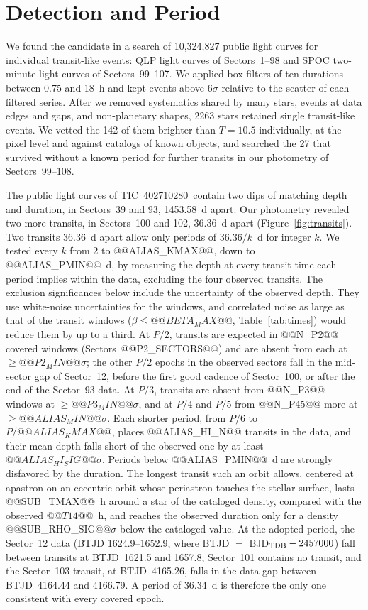 \documentclass[twocolumn,linenumbers]{aastex701}
\newcommand{\tic}{TIC~402710280}
\begin{document}
\section{Detection and Period} \label{sec:period}

We found the candidate in a search of 10,324,827 public light curves for individual transit-like events: QLP light curves of Sectors~1--98 and SPOC two-minute light curves \citep{TESSLC} of Sectors~99--107. We applied box filters of ten durations between 0.75 and 18~h and kept events above $6\sigma$ relative to the scatter of each filtered series. After we removed systematics shared by many stars, events at data edges and gaps, and non-planetary shapes, 2263 stars retained single transit-like events. We vetted the 142 of them brighter than $T = 10.5$ individually, at the pixel level and against catalogs of known objects, and searched the 27 that survived without a known period for further transits in our photometry of Sectors~99--108.

The public light curves of \tic\ contain two dips of matching depth and duration, in Sectors~39 and 93, 1453.58~d apart. Our photometry revealed two more transits, in Sectors~100 and 102, 36.36~d apart (Figure~\ref{fig:transits}). Two transits 36.36~d apart allow only periods of $36.36/k$~d for integer $k$. We tested every $k$ from 2 to @@ALIAS_KMAX@@, down to @@ALIAS_PMIN@@~d, by measuring the depth at every transit time each period implies within the data, excluding the four observed transits. The exclusion significances below include the uncertainty of the observed depth. They use white-noise uncertainties for the windows, and correlated noise as large as that of the transit windows ($\beta \leq @@BETA_MAX@@$, Table~\ref{tab:times}) would reduce them by up to a third. At $P/2$, transits are expected in @@N_P2@@ covered windows (Sectors~@@P2_SECTORS@@) and are absent from each at $\geq @@P2_MIN@@\sigma$; the other $P/2$ epochs in the observed sectors fall in the mid-sector gap of Sector~12, before the first good cadence of Sector~100, or after the end of the Sector~93 data. At $P/3$, transits are absent from @@N_P3@@ windows at $\geq @@P3_MIN@@\sigma$, and at $P/4$ and $P/5$ from @@N_P45@@ more at $\geq @@ALIAS_MIN@@\sigma$. Each shorter period, from $P/6$ to $P/@@ALIAS_KMAX@@$, places @@ALIAS_HI_N@@ transits in the data, and their mean depth falls short of the observed one by at least $@@ALIAS_HI_SIG@@\sigma$. Periods below @@ALIAS_PMIN@@~d are strongly disfavored by the duration. The longest transit such an orbit allows, centered at apastron on an eccentric orbit whose periastron touches the stellar surface, lasts @@SUB_TMAX@@~h around a star of the cataloged density, compared with the observed $@@T14@@$~h, and reaches the observed duration only for a density @@SUB_RHO_SIG@@$\sigma$ below the cataloged value. At the adopted period, the Sector~12 data (BTJD 1624.9--1652.9, where BTJD $=$ BJD$_{\rm TDB} - 2457000$) fall between transits at BTJD~1621.5 and 1657.8, Sector~101 contains no transit, and the Sector~103 transit, at BTJD~4165.26, falls in the data gap between BTJD~4164.44 and 4166.79. A period of 36.34~d is therefore the only one consistent with every covered epoch.
\end{document}
